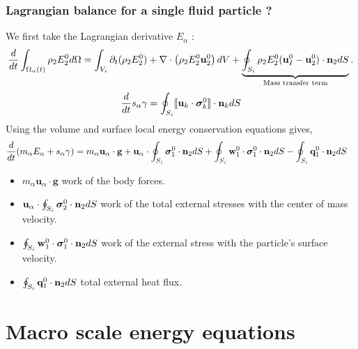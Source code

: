 \documentclass{sintefbeamer}
\begin{document}
\begin{frame}
  \frametitle{Lagrangian balance for a single fluid particle ? }
  We first take the Lagrangian derivative $E_\alpha$ : 
  \begin{multline*}
    \frac{d}{dt} \int_{\Omega_\alpha(t)} \rho_2 E_2^0 d\Omega
    = \int_{V_{i}}  \partial_t (\rho_2 E_2^0) + \mathbf{\nabla}\cdot\left(\rho_2 E_2^0\textbf{u}_2^0\right)  dV
    + \underbrace{\oint_{S_{i}}  \rho_2 E_2^0 (\textbf{u}_I^0-\textbf{u}_2^0)\cdot \textbf{n}_2  dS}_\text{Mass transfer term}.
  \end{multline*}
  \begin{equation*}
    \frac{d}{dt} s_\alpha\gamma
    = \oint_{S_{i}} \llbracket \textbf{u}_k\cdot \bm\sigma_k^0 \rrbracket \cdot \textbf{n}_k dS
  \end{equation*}
  Using the volume and surface local energy conservation equations gives,  
  \begin{align}
    \frac{d}{dt} (m_\alpha E_\alpha + s_\alpha \gamma)
    &= 
    m_\alpha \textbf{u}_\alpha \cdot \textbf{g}
    +\textbf{u}_\alpha \cdot \oint_{S_{i}} \bm{\sigma}_1^0 \cdot \textbf{n}_2 dS   
    +\oint_{S_{i}} \textbf{w}_1^0 \cdot \bm{\sigma}_1^0 \cdot  \textbf{n}_2 dS 
    - \oint_{S_{i}} \textbf{q}_1^0 \cdot \textbf{n}_2 dS
  \end{align}
\begin{itemize}
  \item $m_\alpha \textbf{u}_\alpha \cdot \textbf{g}$ work of the body forces.
  \item $\textbf{u}_\alpha \cdot \oint_{S_{i}} \bm{\sigma}_2^0 \cdot \textbf{n}_2 dS$ work of the total external stresses with the center of mass velocity. 
  \item $\oint_{S_{i}} \textbf{w}_1^0 \cdot \bm{\sigma}_1^0 \cdot  \textbf{n}_2 dS$ work of the external stress with the particle's surface velocity. 
  \item $\oint_{S_{i}} \textbf{q}_1^0 \cdot \textbf{n}_2 dS$ total external heat flux. 
\end{itemize} 
\end{frame}


\section{Macro scale energy equations}
\section*{}
\end{document}
